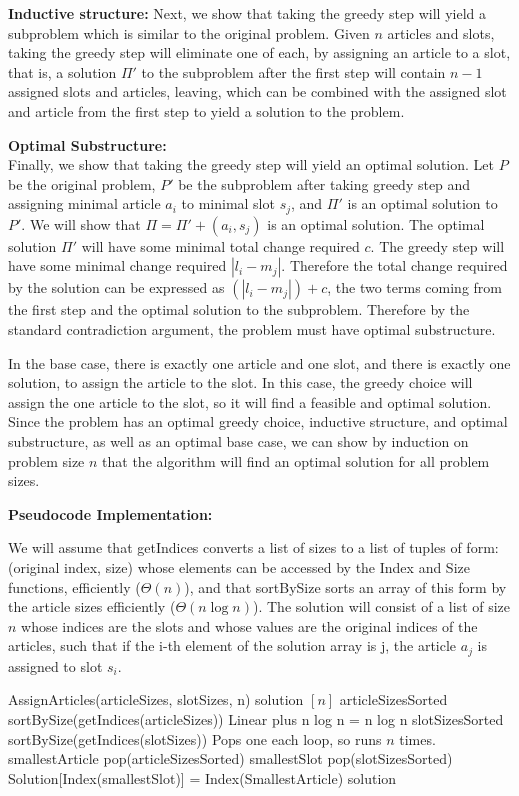 \documentclass[11pt]{article}
\begin{document}
\textbf{Inductive structure: }
Next, we show that taking the greedy step will yield a subproblem which is similar to the original problem. Given $n$ articles and slots, taking the greedy step will eliminate one of each, by assigning an article to a slot, that is, a solution $\Pi'$ to the subproblem after the first step will contain $n-1$ assigned slots and articles, leaving, which can be combined with the assigned slot and article from the first step to yield a solution to the problem.  

\textbf{Optimal Substructure: }\\ 
Finally, we show that taking the greedy step will yield an optimal solution. Let $P$ be the original problem, $P'$ be the subproblem after taking greedy step and assigning minimal article $a_i$ to minimal slot $s_j$, and $\Pi'$ is an optimal solution to $P'$. We will show that $\Pi = \Pi' + {(a_i, s_j)}$ is an optimal solution. The optimal solution $\Pi'$ will have some minimal total change required $c$. The greedy step will have some minimal change required $|l_i - m_j|$. Therefore the total change required by the solution can be expressed as $(|l_i - m_j|) + c$, the two terms coming from the first step and the optimal solution to the subproblem. Therefore by the standard contradiction argument, the problem must have optimal substructure.

In the base case, there is exactly one article and one slot, and there is exactly one solution, to assign the article to the slot. In this case, the greedy choice will assign the one article to the slot, so it will find a feasible and optimal solution. \\ 

Since the problem has an optimal greedy choice, inductive structure, and optimal substructure, as well as an optimal base case, we can show by induction on problem size $n$ that the algorithm will find an optimal solution for all problem sizes.

\textbf{Pseudocode Implementation: }

We will assume that getIndices converts a list of sizes to a list of tuples of form: (original index, size) whose elements can be accessed by the Index and Size functions, efficiently ($\Theta(n)$), and that sortBySize sorts an array of this form by the article sizes efficiently ($\Theta(n\log n)$). The solution will consist of a list of size $n$ whose indices are the slots and whose values are the original indices of the articles, such that if the i-th element of the solution array is j, the article $a_j$ is assigned to slot $s_i$.
\begin{algorithmic}
\State AssignArticles(articleSizes, slotSizes, n)
\State solution \gets $[n]$
\State articleSizesSorted \gets sortBySize(getIndices(articleSizes))  \Comment Linear plus n log n = n log n
\State slotSizesSorted \gets sortBySize(getIndices(slotSizes))
\Comment Pops one each loop, so runs $n$ times.
    \State smallestArticle \gets pop(articleSizesSorted)
    \State smallestSlot \gets pop(slotSizesSorted)
    \State Solution[Index(smallestSlot)] = Index(SmallestArticle)
\EndWhile
\State \Return solution
\end{algorithmic}
\end{document}
